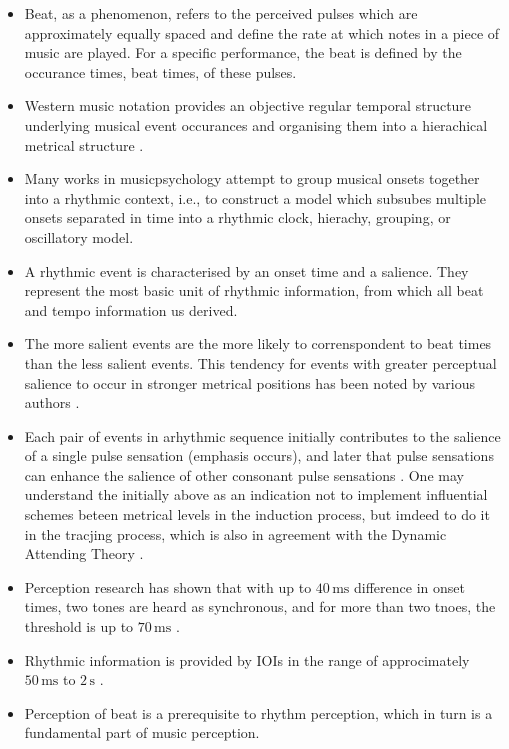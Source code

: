 \documentclass{scrartcl}
\begin{document}
\begin{itemize}
\item Beat, as a phenomenon, refers to the perceived pulses which are approximately equally spaced and define the rate at which notes in a piece of music are played. For a specific performance, the beat is defined by the occurance times, beat times, of these pulses.
\item Western music notation provides an objective regular temporal structure underlying musical event occurances and organising them into a hierachical metrical structure \cite{Gouyon2005}. 
\item Many works in musicpsychology attempt to group musical onsets together into a rhythmic context, i.e., to construct a model which subsubes multiple onsets separated in time into a rhythmic clock, hierachy, grouping, or oscillatory model.
\item A rhythmic event is characterised by an onset time and a salience. They represent the most basic unit of rhythmic information, from which all beat and tempo information us derived.
\item The more salient events are the more likely to correnspondent to beat times than the less salient events. This tendency for events with greater perceptual salience to occur in stronger metrical positions has been noted by various authors \cite{Lerdahl1985,Povel1985,Parncutt1994}.
\item Each pair of events in arhythmic sequence initially contributes to the salience of a single pulse sensation (emphasis occurs), and later that pulse sensations can enhance the salience of other consonant pulse sensations \cite{Parncutt1994}. One may understand the initially above as an indication not to implement influential schemes beteen metrical levels in the induction process, but imdeed to do it in the tracjing process, which is also in agreement with the Dynamic Attending Theory \cite{Jones1989}.
\item Perception research has shown that with up to $40\,\text{ms}$ difference in onset times, two tones are heard as synchronous, and for more than two tnoes, the threshold is up to $70\,\text{ms}$ \cite{Handel1989}. 
\item Rhythmic information is provided by IOIs in the range of approcimately $50\,\text{ms}$ to $2\,\text{s}$ \cite{Handel1989}.
\item Perception of beat is a prerequisite to rhythm perception, which in turn is a fundamental part of music perception.

\end{itemize}
\end{document}
